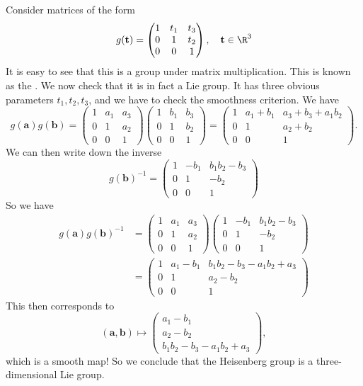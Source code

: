 \documentclass[a4paper]{article}
\begin{document}
\begin{eg}
  Consider matrices of the form
  \[
    g(\mathbf{t}) =
    \begin{pmatrix}
      1 & t_1 & t_3\\
      0 & 1 & t_2\\
      0 & 0 & 1
    \end{pmatrix},\quad \mathbf{t} \in \R^3
  \]
  It is easy to see that this is a group under matrix multiplication. This is known as the . We now check that it is in fact a Lie group. It has three obvious parameters $t_1, t_2, t_3$, and we have to check the smoothness criterion. We have
  \[
    g(\mathbf{a}) g(\mathbf{b}) =
    \begin{pmatrix}
      1 & a_1 & a_3\\
      0 & 1 & a_2\\
      0 & 0 & 1
    \end{pmatrix}
    \begin{pmatrix}
      1 & b_1 & b_3\\
      0 & 1 & b_2\\
      0 & 0 & 1
    \end{pmatrix} =
    \begin{pmatrix}
      1 & a_1 + b_1 & a_3 + b_3 + a_1 b_2\\
      0 & 1 & a_2 + b_2\\
      0 & 0 & 1
    \end{pmatrix}.
  \]
  We can then write down the inverse
  \[
    g(\mathbf{b})^{-1}=
    \begin{pmatrix}
      1 & - b_1 & b_1 b_2 - b_3\\
      0 & 1 & -b_2\\
      0 & 0 & 1
    \end{pmatrix}
  \]
  So we have
  \begin{align*}
    g(\mathbf{a}) g(\mathbf{b})^{-1} &=
    \begin{pmatrix}
      1 & a_1 & a_3\\
      0 & 1 & a_2\\
      0 & 0 & 1
    \end{pmatrix}
    \begin{pmatrix}
      1 & - b_1 & b_1 b_2 - b_3\\
      0 & 1 & -b_2\\
      0 & 0 & 1
    \end{pmatrix} \\
    &=
    \begin{pmatrix}
      1 & a_1 - b_1 & b_1 b_2 - b_3 - a_1 b_2 + a_3\\
      0 & 1 & a_2 - b_2\\
      0 & 0 & 1
    \end{pmatrix}
  \end{align*}
  This then corresponds to
  \[
    (\mathbf{a}, \mathbf{b}) \mapsto
    \begin{pmatrix}
      a_1 - b_1\\
      a_2 -b_2\\
      b_1 b_2 - b_3 - a_1 b_2 + a_3
    \end{pmatrix},
  \]
  which is a smooth map! So we conclude that the Heisenberg group is a three-dimensional Lie group.
\end{eg}
\end{document}
